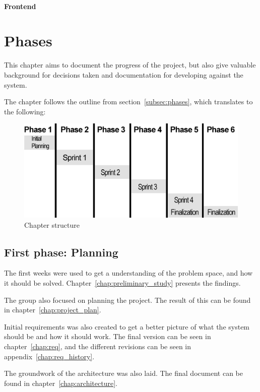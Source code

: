 \documentclass[11pt]{book}
\begin{document}
\subsubsection{Frontend}


\chapter{Phases}
This chapter aims to document the progress of the project, but also give valuable background for decisions taken and documentation for developing against the system.

The chapter follows the outline from section~\ref{subsec:phases}, which translates to the following:
\begin{figure}[H]
    \centering
    \includegraphics[width=1.0\textwidth]{Figures/Phases/phases.png}
    \caption{Chapter structure}
    \label{fig:phases_structure}
\end{figure}

\section{First phase: Planning}
The first weeks were used to get a understanding of the problem space, and how it should be solved. Chapter~\ref{chap:preliminary_study} presents the findings.

The group also focused on planning the project. The result of this can be found in chapter~\ref{chap:project_plan}.

Initial requirements was also created to get a better picture of what the system should be and how it should work. The final version can be seen in chapter~\ref{chap:req}, and the different revisions can be seen in appendix~\ref{chap:req_history}.

The groundwork of the architecture was also laid. The final document can be found in chapter~\ref{chap:architecture}.
\end{document}
